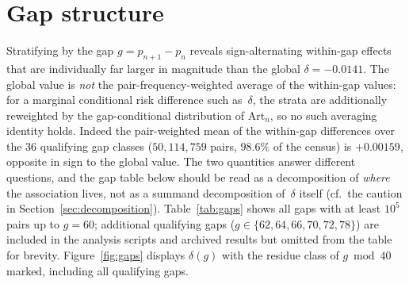 \documentclass[11pt]{amsart}
\theoremstyle{definition}
\newcommand{\Art}{\mathrm{Art}}
\begin{document}
\section{Gap structure}
\label{sec:gaps}

Stratifying by the gap $g = p_{n+1} - p_n$ reveals sign-alternating
within-gap effects that are individually far larger in magnitude than the
global $\delta = -0.0141$. The global value is \emph{not} the
pair-frequency-weighted average of the within-gap values: for a marginal
conditional risk difference such as~$\delta$, the strata are additionally
reweighted by the gap-conditional distribution of $\Art_n$, so no such
averaging identity holds. Indeed the pair-weighted mean of the within-gap
differences over the $36$ qualifying gap classes ($50{,}114{,}759$ pairs,
$98.6\%$ of the census) is $+0.00159$, opposite in sign to the global value.
The two quantities answer different questions, and the gap table below should
be read as a decomposition of \emph{where} the association lives, not as a
summand decomposition of~$\delta$ itself (cf.\ the caution in
Section~\ref{sec:decomposition}).
Table~\ref{tab:gaps} shows all gaps with at least $10^5$ pairs up to $g = 60$;
additional qualifying gaps ($g \in \{62, 64, 66, 70, 72, 78\}$) are included
in the analysis scripts and archived results but omitted from the table
for brevity.
Figure~\ref{fig:gaps} displays $\delta(g)$ with the residue class of
$g \bmod 40$ marked, including all qualifying gaps.
\end{document}
